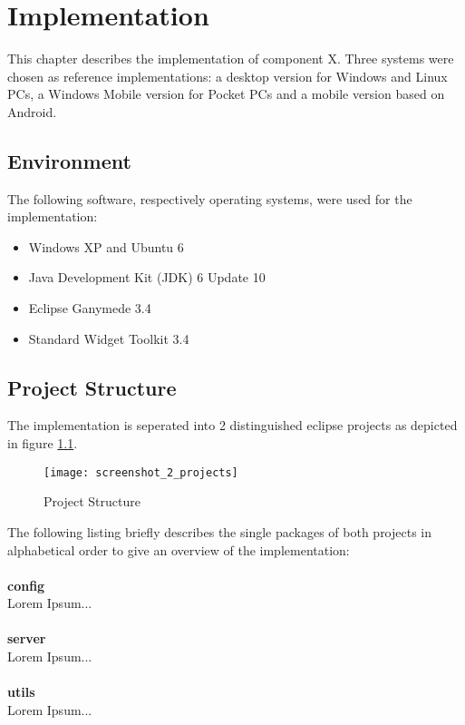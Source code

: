 \chapter{Implementation\label{cha:chapter5}}

This chapter describes the implementation of component X. Three systems were chosen as reference implementations: a desktop version for Windows and Linux PCs, a Windows Mobile version for Pocket PCs and a mobile version based on Android.

\section{Environment\label{sec:env}}
The following software, respectively operating systems, were used for the implementation:

\begin{itemize}
		\item Windows XP and Ubuntu 6
		\vspace{-0.1in}
		\item Java Development Kit (JDK) 6 Update 10
		\vspace{-0.1in}
		\item Eclipse Ganymede 3.4
		\vspace{-0.1in}
		\item Standard Widget Toolkit 3.4
\end{itemize}

\section{Project Structure\label{sec:projectstructure}}

The implementation is seperated into 2 distinguished eclipse projects as depicted in figure \ref{fig:projects}.

\begin{figure}[htb]
  \centering
  \texttt{[image: screenshot\_2\_projects]}
  \caption{Project Structure}
  \label{fig:projects}
\end{figure}

\noindent
The following listing briefly describes the single packages of both projects in alphabetical order to give an overview of the implementation:
\\
\\
\textbf{config}
\\
Lorem Ipsum...
\\
\\
\textbf{server}
\\
Lorem Ipsum...
\\
\\
\textbf{utils}
\\
Lorem Ipsum...


